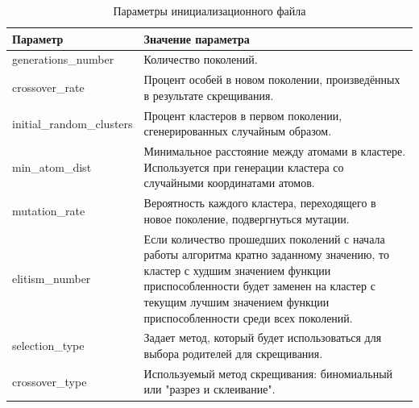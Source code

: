 \begin{table}[H]
\begin{center}
\begin{tabular}{|p{0.25\linewidth}|p{0.75\linewidth}|}
  \hline
  \textbf{Параметр}       &    \textbf{Значение параметра} \\
  \hline
  generations\_number     &    Количество поколений. \\
  \hline
  crossover\_rate         &    Процент особей в новом поколении, произведённых в
                               результате скрещивания. \\
  \hline
  initial\_random\_clusters &  Процент кластеров в первом поколении, сгенерированных
                               случайным образом. \\
  \hline
  min\_atom\_dist           &  Минимальное расстояние между атомами в кластере.
                               Используется при генерации кластера со случайными координатами атомов. \\
  \hline
  mutation\_rate            &  Вероятность каждого кластера, переходящего в новое поколение, подвергнуться
                               мутации. \\
  \hline
  elitism\_number           &  Если количество прошедших поколений с начала работы алгоритма кратно заданному
                               значению, то кластер с худшим значением функции приспособленности будет заменен
                               на кластер с текущим лучшим значением функции приспособленности среди всех
                               поколений. \\
  \hline
  selection\_type           &  Задает метод, который будет использоваться для выбора родителей для скрещивания. \\
  \hline
  crossover\_type           &  Используемый метод скрещивания: биномиальный или "разрез и склеивание". \\
  \hline
\end{tabular}
\caption{Параметры инициализационного файла}
\label{table:iniparams}
\end{center}
\end{table}
